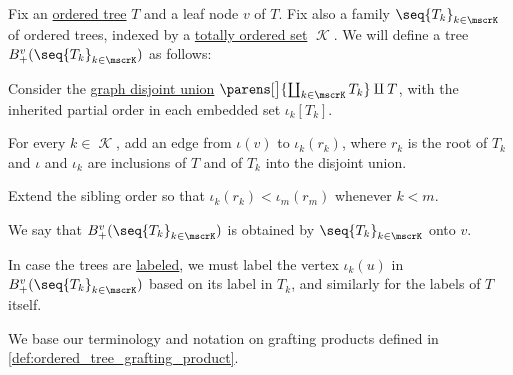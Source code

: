 \begin{definition}\label{def:ordered_tree_grafting}\mimprovised
  Fix an \hyperref[def:ordered_tree]{ordered tree} \( T \) and a leaf node \( v \) of \( T \). Fix also a family \( \seq{ T_k }_{k \in \mscrK} \) of ordered trees, indexed by a \hyperref[def:totally_ordered_set]{totally ordered set} \( \mscrK \). We will define a tree \( B_+^v(\seq{ T_k }_{k \in \mscrK}) \) as follows:
  \begin{thmenum}
     Consider the \hyperref[def:graph_disjoint_union]{graph disjoint union} \( \parens[\big]{ \coprod_{k \in \mscrK} T_k } \amalg T \), with the inherited partial order in each embedded set \( \iota_k[T_k] \).

     For every \( k \in \mscrK \), add an edge from \( \iota(v) \) to \( \iota_k(r_k) \), where \( r_k \) is the root of \( T_k \) and \( \iota \) and \( \iota_k \) are inclusions of \( T \) and of \( T_k \) into the disjoint union.

     Extend the sibling order so that \( \iota_k(r_k) < \iota_m(r_m) \) whenever \( k < m \).
  \end{thmenum}

  We say that \( B_+^v(\seq{ T_k }_{k \in \mscrK}) \) is obtained by  \( \seq{ T_k }_{k \in \mscrK} \) onto \( v \).
\end{definition}
\begin{comments}
  \item In case the trees are \hyperref[def:labeled_tree]{labeled}, we must label the vertex \( \iota_k(u) \) in \( B_+^v(\seq{ T_k }_{k \in \mscrK}) \) based on its label in \( T_k \), and similarly for the labels of \( T \) itself.

  \item We base our terminology and notation on grafting products defined in \cref{def:ordered_tree_grafting_product}.
\end{comments}

